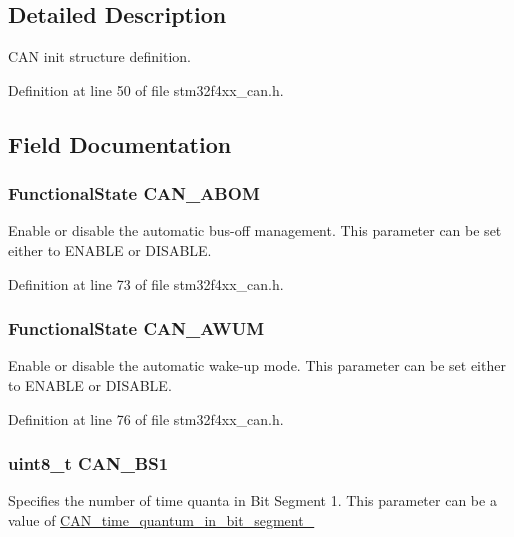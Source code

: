 \subsection{Detailed Description}
C\-A\-N init structure definition. 

Definition at line 50 of file stm32f4xx\-\_\-can.\-h.



\subsection{Field Documentation}
\hypertarget{struct_c_a_n___init_type_def_a35b9420322c66febde319a638354e596}{
\subsubsection[{C\-A\-N\-\_\-\-A\-B\-O\-M}]{\setlength{\rightskip}{0pt plus 5cm}Functional\-State C\-A\-N\-\_\-\-A\-B\-O\-M}}\label{struct_c_a_n___init_type_def_a35b9420322c66febde319a638354e596}
Enable or disable the automatic bus-\/off management. This parameter can be set either to E\-N\-A\-B\-L\-E or D\-I\-S\-A\-B\-L\-E. 

Definition at line 73 of file stm32f4xx\-\_\-can.\-h.

\hypertarget{struct_c_a_n___init_type_def_a8f5475c5b4c675c4662f62c23fd58097}{
\subsubsection[{C\-A\-N\-\_\-\-A\-W\-U\-M}]{\setlength{\rightskip}{0pt plus 5cm}Functional\-State C\-A\-N\-\_\-\-A\-W\-U\-M}}\label{struct_c_a_n___init_type_def_a8f5475c5b4c675c4662f62c23fd58097}
Enable or disable the automatic wake-\/up mode. This parameter can be set either to E\-N\-A\-B\-L\-E or D\-I\-S\-A\-B\-L\-E. 

Definition at line 76 of file stm32f4xx\-\_\-can.\-h.

\hypertarget{struct_c_a_n___init_type_def_a6244c64f0e5ff7fb26d8aefb272787c5}{
\subsubsection[{C\-A\-N\-\_\-\-B\-S1}]{\setlength{\rightskip}{0pt plus 5cm}uint8\-\_\-t C\-A\-N\-\_\-\-B\-S1}}\label{struct_c_a_n___init_type_def_a6244c64f0e5ff7fb26d8aefb272787c5}
Specifies the number of time quanta in Bit Segment 1. This parameter can be a value of \hyperlink{group___c_a_n__time__quantum__in__bit__segment__1}{C\-A\-N\-\_\-time\-\_\-quantum\-\_\-in\-\_\-bit\-\_\-segment\-\_} 

